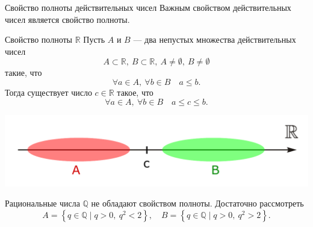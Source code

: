 \documentclass[8pt]{beamer}
\begin{document}

\begin{frame}{Свойство полноты действительных чисел}
Важным свойством действительных чисел является свойство полноты.

\begin{block}{Свойство полноты $\mathbb{R}$}
Пусть $A$ и $B$ --- два непустых множества действительных чисел
$$A\subset \mathbb{R},\ B\subset\mathbb{R},\ A\ne \emptyset,\ B\ne \emptyset$$
такие, что
$$\forall a\in A,\ \forall b\in B \quad a\le b.$$
Тогда существует число $c\in\mathbb{R}$ такое, что
$$\forall a\in A,\ \forall b\in B \quad a \le c \le b.$$

\begin{center}
\includegraphics[scale=0.4]{pictR2.pdf}
\end{center}

\end{block}
\pause
Рациональные числа $\mathbb{Q}$ не обладают свойством полноты. Достаточно рассмотреть
$$A=\left\{ q\in\mathbb{Q} \mid q>0,\ q^2<2 \right\},\quad B=\left\{ q\in\mathbb{Q} \mid q>0,\ q^2>2 \right\}.$$

\end{frame}
\end{document}
